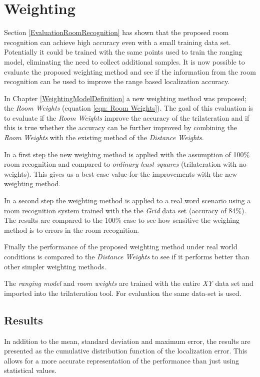 \newpage

\section{Weighting}
\label{EvaluationWeighting}

Section \ref{EvaluationRoomRecognition} has shown that the proposed room recognition can achieve high accuracy even with a small training data set. Potentially it could be trained with the same points used to train the ranging model, eliminating the need to collect additional samples. It is now possible to evaluate the proposed weighting method and see if the information from the room recognition can be used to improve the range based localization accuracy.

In Chapter \ref{WeightingModelDefinition} a new weighting method was proposed; the \emph{Room Weights} (equation \ref{eqn: Room Weights}). The goal of this evaluation is to evaluate if the \emph{Room Weights} improve the accuracy of the trilateration and if this is true whether the accuracy can be further improved by combining the \emph{Room Weights} with the existing method of the \emph{Distance Weights}.

In a first step the new weighing method is applied with the assumption of 100\% room recognition and compared to \emph{ordinary least squares} (trilateration with no weights). This gives us a best case value for the improvements with the new weighting method.

In a second step the weighting method is applied to a real word scenario using a room recognition system trained with the the \emph{Grid} data set (accuracy of 84\%). The results are compared to the 100\% case to see how sensitive the weighing method is to errors in the room recognition.

Finally the performance of the proposed weighting method under real world conditions is compared to the \emph{Distance Weights} to see if it performs better than other simpler weighting methods.

The \emph{ranging model} and \emph{room weights} are trained with the entire \emph{XY} data set and imported into the trilateration tool. For evaluation the same data-set is used.

\subsection{Results}
In addition to the mean, standard deviation and maximum error, the results are presented as the cumulative distribution function of the localization error. This allows for a more accurate representation of the performance than just using statistical values.

